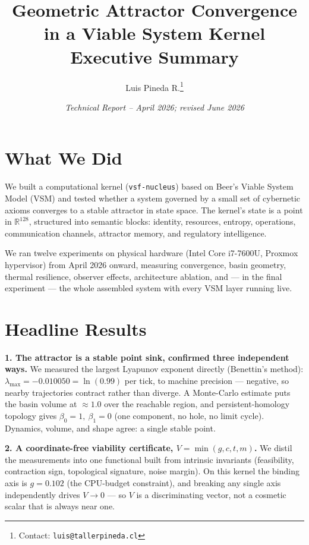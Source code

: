 \documentclass[11pt, a4paper]{article}
\title{%
  \textbf{Geometric Attractor Convergence in a Viable System Kernel}\\[4pt]
  \large Executive Summary
}
\author{Luis Pineda R.\thanks{Contact: \texttt{luis@tallerpineda.cl}}}
\date{\textit{Technical Report -- April 2026; revised June 2026}}
\newcommand{\R}{\mathbb{R}}
\newcommand{\nucleus}{\texttt{vsf-nucleus}}
\begin{document}
\maketitle

\section*{What We Did}

We built a computational kernel (\nucleus{}) based on Beer's Viable System Model
(VSM) and tested whether a system governed by a small set of cybernetic axioms
converges to a stable attractor in state space. The kernel's state is a point in
$\R^{128}$, structured into semantic blocks: identity, resources, entropy,
operations, communication channels, attractor memory, and regulatory intelligence.

We ran twelve experiments on physical hardware (Intel Core i7-7600U, Proxmox
hypervisor) from April 2026 onward, measuring convergence, basin geometry, thermal
resilience, observer effects, architecture ablation, and --- in the final experiment
--- the whole assembled system with every VSM layer running live.

\section*{Headline Results}

\textbf{1. The attractor is a stable point sink, confirmed three independent ways.}
We measured the largest Lyapunov exponent directly (Benettin's method):
$\lambda_\text{max} = -0.010050 = \ln(0.99)$ per tick, to machine precision ---
negative, so nearby trajectories contract rather than diverge. A Monte-Carlo
estimate puts the basin volume at $\approx 1.0$ over the reachable region, and
persistent-homology topology gives $\beta_0 = 1,\ \beta_1 = 0$ (one component, no
hole, no limit cycle). Dynamics, volume, and shape agree: a single stable point.

\textbf{2. A coordinate-free viability certificate, $V = \min(g, c, t, m)$.}
We distil the measurements into one functional built from intrinsic invariants
(feasibility, contraction sign, topological signature, noise margin). On this kernel
the binding axis is $g = 0.102$ (the CPU-budget constraint), and breaking any single
axis independently drives $V \to 0$ --- so $V$ is a discriminating vector, not a
cosmetic scalar that is always near one.
\end{document}
